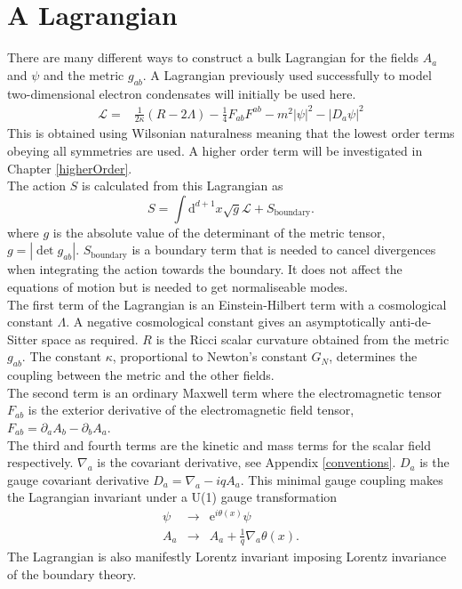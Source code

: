 \documentclass[12pt]{report}
\renewcommand{\d}{\ensuremath{\mathrm{d}}}
\renewcommand{\L}{\ensuremath{\mathcal{L}}}
\begin{document}
\section{A Lagrangian}
There are many different ways to construct a bulk Lagrangian for the fields $A_a$ and  $\psi$ and the metric $g_{ab}$. A Lagrangian previously used successfully to model two-dimensional electron condensates \cite{hartnoll9, horowitz} will initially be used here.
\begin{eqnarray}
 \mathcal{L}=&\frac{1}{2\kappa}\left(R-2\Lambda\right)-\frac{1}{4}F_{ab}F^{ab}-m^2|\psi|^2-|D_a\psi|^2
\label{L}
\end{eqnarray}
This is obtained using Wilsonian naturalness meaning that the lowest order terms obeying all symmetries are used. A higher order term will be investigated in Chapter \ref{higherOrder}.\\

The action $S$ is calculated from this Lagrangian as
\begin{equation}
 S=\int\d^{d+1} x\sqrt{g}\L+S_\mathrm{boundary}.
\end{equation}
where $g$ is the absolute value of the determinant of the metric tensor, $g=|\det g_{ab}|$. $S_\mathrm{boundary}$ is a boundary term that is needed to cancel divergences when integrating the action towards the boundary. It does not affect the equations of motion but is needed to get normaliseable modes.\\

The first term of the Lagrangian is an Einstein-Hilbert term with a cosmological constant $\Lambda$. A negative cosmological constant gives an asymptotically anti-de-Sitter space as required. $R$ is the Ricci scalar curvature obtained from the metric $g_{ab}$. The constant $\kappa$, proportional to Newton's constant $G_N$, determines the coupling between the metric and the other fields.\\

The second term is an ordinary Maxwell term where the electromagnetic tensor $F_{ab}$ is the exterior derivative of the electromagnetic field tensor, $F_{ab}=\partial_aA_b-\partial_bA_a$.\\

The third and fourth terms are the kinetic and mass terms for the scalar field respectively. $\nabla_a$ is the covariant derivative, see Appendix \ref{conventions}. $D_a$ is the gauge covariant derivative $D_a=\nabla_a-iqA_a$. This minimal gauge coupling makes the Lagrangian invariant under a U(1) gauge transformation
\begin{eqnarray}
 \psi&\rightarrow&\mathrm{e}^{i\theta(x)}\psi\\
 A_a&\rightarrow& A_a+\frac{1}{q}\nabla_a\theta(x)\label{Agauge}.
\end{eqnarray}
The Lagrangian is also manifestly Lorentz invariant imposing Lorentz invariance of the boundary theory.
\end{document}

